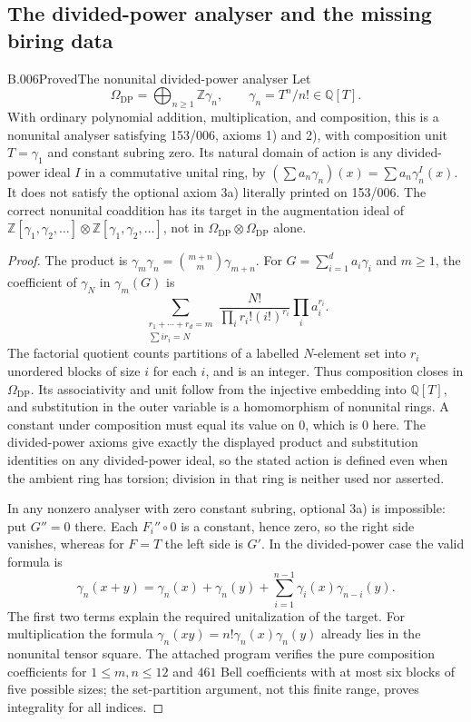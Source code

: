 \subsection{The divided-power analyser and the missing biring data}

\begin{saresult}{B.006}{Proved}{The nonunital divided-power analyser}
Let
\[
 \Omega_{\mathrm{DP}}=\bigoplus_{n\ge1}\mathbb Z\gamma_n,
 \qquad \gamma_n=T^n/n!\in\mathbb Q[T].
\]
With ordinary polynomial addition, multiplication, and composition,
this is a nonunital analyser satisfying 153/006, axioms 1) and 2),
with composition unit $T=\gamma_1$ and constant subring zero. Its
natural domain of action is any divided-power ideal $I$ in a
commutative unital ring, by
$\left(\sum a_n\gamma_n\right)(x)=\sum a_n\gamma_n^I(x)$.
It does not satisfy the optional axiom 3a) literally printed on
153/006. The correct nonunital coaddition has its target in the
augmentation ideal of
$\mathbb Z[\gamma_1,\gamma_2,\ldots]\otimes
 \mathbb Z[\gamma_1,\gamma_2,\ldots]$, not in
$\Omega_{\mathrm{DP}}\otimes\Omega_{\mathrm{DP}}$ alone.
\end{saresult}
\begin{proof}
The product is
$\gamma_m\gamma_n=\binom{m+n}{m}\gamma_{m+n}$.
For $G=\sum_{i=1}^d a_i\gamma_i$ and $m\ge1$, the coefficient of
$\gamma_N$ in $\gamma_m(G)$ is
\[
 \sum_{\substack{r_1+\cdots+r_d=m\\\sum i r_i=N}}
 \frac{N!}{\prod_i r_i!(i!)^{r_i}}\prod_i a_i^{r_i}.
\]
The factorial quotient counts partitions of a labelled $N$-element
set into $r_i$ unordered blocks of size $i$ for each $i$, and is an
integer. Thus composition closes in $\Omega_{\mathrm{DP}}$.
Its associativity and unit follow from the injective embedding into
$\mathbb Q[T]$, and substitution in the outer variable is a
homomorphism of nonunital rings. A constant under composition must
equal its value on $0$, which is $0$ here. The divided-power axioms
give exactly the displayed product and substitution identities on
any divided-power ideal, so the stated action is defined even when
the ambient ring has torsion; division in that ring is neither
used nor asserted.

In any nonzero analyser with zero constant subring, optional 3a)
is impossible: put $G''=0$ there. Each $F_i''\circ0$ is a constant,
hence zero, so the right side vanishes, whereas for $F=T$ the left
side is $G'$. In the divided-power case the valid formula is
\[
 \gamma_n(x+y)=\gamma_n(x)+\gamma_n(y)
   +\sum_{i=1}^{n-1}\gamma_i(x)\gamma_{n-i}(y).
\]
The first two terms explain the required unitalization of the target.
For multiplication the formula
$\gamma_n(xy)=n!\gamma_n(x)\gamma_n(y)$ already lies in the
nonunital tensor square. The attached program verifies the pure
composition coefficients for $1\le m,n\le12$ and $461$ Bell
coefficients with at most six blocks of five possible sizes; the
set-partition argument, not this finite range, proves integrality
for all indices.
\end{proof}


